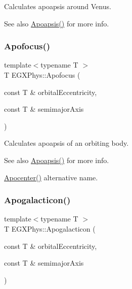 Calculates apoapsis around Venus. 

\begin{DoxySeeAlso}{See also}
\mbox{\hyperlink{group___e_g_x_phys-_apoapsis_gaf962e650bf84a568458e8eb39b1c61ba}{Apoapsis()}} for more info. 
\end{DoxySeeAlso}
\mbox{\label{group___e_g_x_phys-_apoapsis_gaa53ac4e15bc6bc0fecf72eadb7a513e0}} 
\subsubsection{\texorpdfstring{Apofocus()}{Apofocus()}}
{\footnotesize\ttfamily template$<$typename T $>$ \\
T E\+G\+X\+Phys\+::\+Apofocus (\begin{DoxyParamCaption}\item[{const T \&}]{orbital\+Eccentricity,  }\item[{const T \&}]{semimajor\+Axis }\end{DoxyParamCaption})}



Calculates apoapsis of an orbiting body. 

\begin{DoxySeeAlso}{See also}
\mbox{\hyperlink{group___e_g_x_phys-_apoapsis_gaf962e650bf84a568458e8eb39b1c61ba}{Apoapsis()}} for more info. 

\mbox{\hyperlink{group___e_g_x_phys-_apoapsis_ga5e51a53e2f974264bada34f159fdc948}{Apocenter()}} alternative name. 
\end{DoxySeeAlso}
\mbox{\label{group___e_g_x_phys-_apoapsis_ga09b4c7d5e971dc28e1ba37f479958c27}} 
\subsubsection{\texorpdfstring{Apogalacticon()}{Apogalacticon()}}
{\footnotesize\ttfamily template$<$typename T $>$ \\
T E\+G\+X\+Phys\+::\+Apogalacticon (\begin{DoxyParamCaption}\item[{const T \&}]{orbital\+Eccentricity,  }\item[{const T \&}]{semimajor\+Axis }\end{DoxyParamCaption})}



